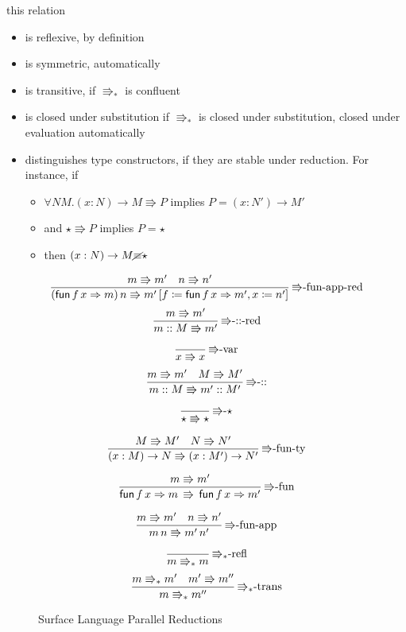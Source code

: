 this relation
\begin{itemize}
\item is reflexive, by definition
\item is symmetric, automatically
\item is transitive, if $\Rrightarrow_{\ast}$ is confluent
\item is closed under substitution if $\Rrightarrow_{\ast}$ is closed under
substitution, closed under evaluation automatically
\item distinguishes type constructors, if they are stable under reduction.
For instance, if
\begin{itemize}
\item $\forall NM.\left(x:N\right)\rightarrow M\Rrightarrow P$ implies
$P=\left(x:N'\right)\rightarrow M'$
\item and $\star\Rrightarrow P$ implies $P=\star$
\item then $\left(x:N\right)\rightarrow M\cancel{\equiv}\star$
\end{itemize}
\end{itemize}
\begin{figure}
\[
\frac{m\Rrightarrow m'\quad n\Rrightarrow n'}{\left(\mathsf{fun}\,f\,x\Rightarrow m\right)n\Rrightarrow m'\left[f\coloneqq\mathsf{fun}\,f\,x\Rightarrow m',x\coloneqq n'\right]}\,\textrm{\ensuremath{\Rrightarrow}-fun-app-red}
\]
\[
\frac{m\Rrightarrow m'}{m::M\Rrightarrow m'}\,\textrm{\ensuremath{\Rrightarrow}-::-red}
\]

\[
\frac{\,}{x\Rrightarrow x}\,\textrm{\ensuremath{\Rrightarrow}-var}
\]
\[
\frac{m\Rrightarrow m'\quad M\Rrightarrow M'}{m::M\Rrightarrow m'::M'}\,\textrm{\ensuremath{\Rrightarrow}-::}
\]

\[
\frac{\,}{\star\Rrightarrow\star}\,\textrm{\ensuremath{\Rrightarrow}-}\star
\]

\[
\frac{M\Rrightarrow M'\quad N\Rrightarrow N'}{\left(x:M\right)\rightarrow N\Rrightarrow\left(x:M'\right)\rightarrow N'}\,\textrm{\ensuremath{\Rrightarrow}-fun-ty}
\]

\[
\frac{m\Rrightarrow m'}{\mathsf{fun}\,f\,x\Rightarrow m\,\Rrightarrow\,\mathsf{fun}\,f\,x\Rightarrow m'}\,\textrm{\ensuremath{\Rrightarrow}-fun}
\]

\[
\frac{m\Rrightarrow m'\quad n\Rrightarrow n'}{m\,n\Rrightarrow m'\,n'}\,\textrm{\ensuremath{\Rrightarrow}-fun-app}
\]

\[
\frac{\,}{m\Rrightarrow_{\ast}m}\,\textrm{\ensuremath{\Rrightarrow_{\ast}}-refl}
\]
\[
\frac{m\Rrightarrow_{\ast}m'\quad m'\Rrightarrow m''}{m\Rrightarrow_{\ast}m''}\,\textrm{\ensuremath{\Rrightarrow_{\ast}}-trans}
\]

\caption{Surface Language Parallel Reductions}
\label{fig:surface-reduction}
\end{figure}

